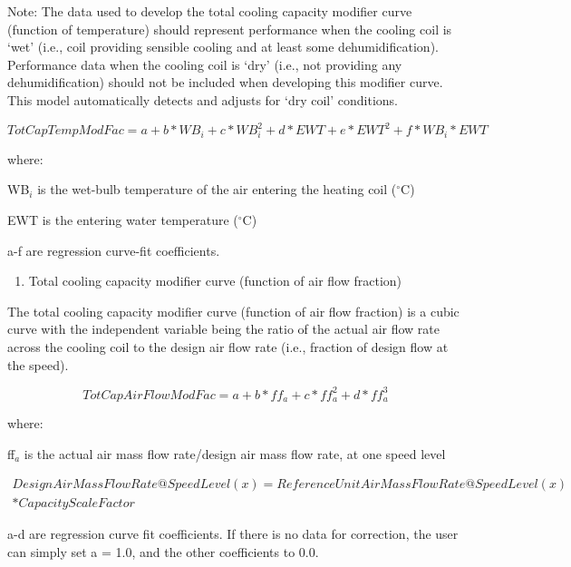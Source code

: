 Note: The data used to develop the total cooling capacity modifier curve (function of temperature) should represent performance when the cooling coil is `wet' (i.e., coil providing sensible cooling and at least some dehumidification). Performance data when the cooling coil is `dry' (i.e., not providing any dehumidification) should not be included when developing this modifier curve. This model automatically detects and adjusts for `dry coil' conditions.

\begin{equation}
TotCapTempModFac = a + b*W{B_i} + c*WB_i^2 + d*EWT + e*EW{T^2} + f*W{B_i}*EWT
\end{equation}

where:

WB\(_{i}\) is the wet-bulb temperature of the air entering the heating coil (\(^{\circ}\)C)

EWT is the entering water temperature (\(^{\circ}\)C)

a-f are regression curve-fit coefficients.

\begin{enumerate}
\def\labelenumi{\arabic{enumi})}
\setcounter{enumi}{1}
\item Total cooling capacity modifier curve (function of air flow fraction)
\end{enumerate}

The total cooling capacity modifier curve (function of air flow fraction) is a cubic curve with the independent variable being the ratio of the actual air flow rate across the cooling coil to the design air flow rate (i.e., fraction of design flow at the speed).

\begin{equation}
TotCapAirFlowModFac = a + b*f{f_a} + c*ff_a^2 + d*ff_a^3
\end{equation}

where:

ff\(_{a}\) is the actual air mass flow rate/design air mass flow rate, at one speed level

\begin{equation}
\begin{split}
  DesignAirMassFlowRate@SpeedLevel(x) = ReferenceUnitAirMassFlowRate@SpeedLevel(x) \\
  * CapacityScaleFactor
\end{split}
\end{equation}

a-d are regression curve fit coefficients.  If there is no data for correction, the user can simply set a = 1.0, and the other coefficients to 0.0.

